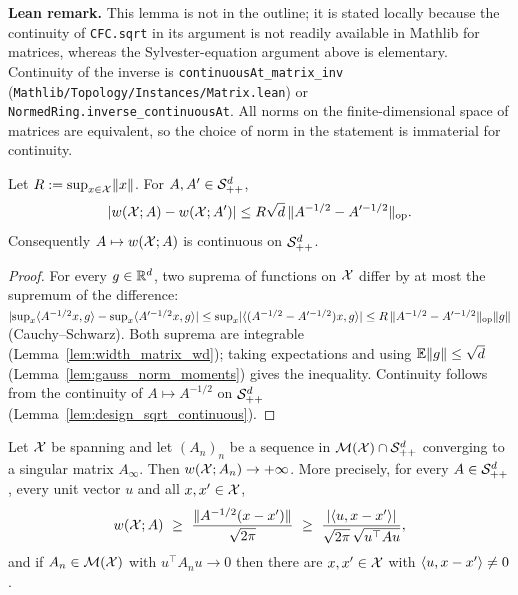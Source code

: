 \textbf{Lean remark.} This lemma is not in the outline; it is stated locally because the
continuity of \texttt{CFC.sqrt} in its argument is not readily available in Mathlib for
matrices, whereas the Sylvester-equation argument above is elementary. Continuity of the inverse
is \texttt{continuousAt\_matrix\_inv} (\texttt{Mathlib/Topology/Instances/Matrix.lean}) or
\texttt{NormedRing.inverse\_continuousAt}. All norms on the finite-dimensional space of matrices
are equivalent, so the choice of norm in the statement is immaterial for continuity.

\begin{lemma}\label{lem:width_matrix_continuous}
Let $R := \sup_{x\in\mathcal{X}}\lVert x \rVert$. For $A, A' \in \mathcal{S}_{++}^{d}$,
\[
  \lvert w(\mathcal{X};A) - w(\mathcal{X};A') \rvert \le R\sqrt d\,\lVert A^{-1/2} - A'^{-1/2} \rVert_{\mathrm{op}} .
\]
Consequently $A \mapsto w(\mathcal{X};A)$ is continuous on $\mathcal{S}_{++}^{d}$.
\end{lemma}

\begin{proof}
For every $g \in \mathbb{R}^d$, two suprema of functions on $\mathcal{X}$ differ by at most the supremum of the
difference:
$\lvert \sup_x\langle A^{-1/2}x, g \rangle - \sup_x\langle A'^{-1/2}x, g \rangle \rvert \le \sup_x\lvert \langle (A^{-1/2} - A'^{-1/2})x, g \rangle \rvert
\le R\,\lVert A^{-1/2} - A'^{-1/2} \rVert_{\mathrm{op}}\lVert g \rVert$ (Cauchy--Schwarz). Both suprema are
integrable (Lemma~\ref{lem:width_matrix_wd}); taking expectations and using
$\mathbb{E}\lVert g \rVert \le \sqrt d$ (Lemma~\ref{lem:gauss_norm_moments}) gives the inequality. Continuity
follows from the continuity of $A \mapsto A^{-1/2}$ on $\mathcal{S}_{++}^{d}$
(Lemma~\ref{lem:design_sqrt_continuous}).
\end{proof}

\begin{lemma}\label{lem:width_coercive}
Let $\mathcal{X}$ be spanning and let $(A_n)_n$ be a sequence in $\mathcal{M}(\mathcal{X}) \cap \mathcal{S}_{++}^{d}$ converging to a singular matrix
$A_\infty$. Then $w(\mathcal{X};A_n) \to +\infty$. More precisely, for every $A \in \mathcal{S}_{++}^{d}$, every
unit vector $u$ and all $x, x' \in \mathcal{X}$,
\[
  w(\mathcal{X};A) \ \ge\ \frac{\lVert A^{-1/2}(x - x') \rVert}{\sqrt{2\pi}}
  \ \ge\ \frac{\lvert \langle u, x - x' \rangle \rvert}{\sqrt{2\pi}\,\sqrt{u^\top A u}} ,
\]
and if $A_n \in \mathcal{M}(\mathcal{X})$ with $u^\top A_n u \to 0$ then there are $x, x' \in \mathcal{X}$ with
$\langle u, x - x' \rangle \ne 0$.
\end{lemma}

